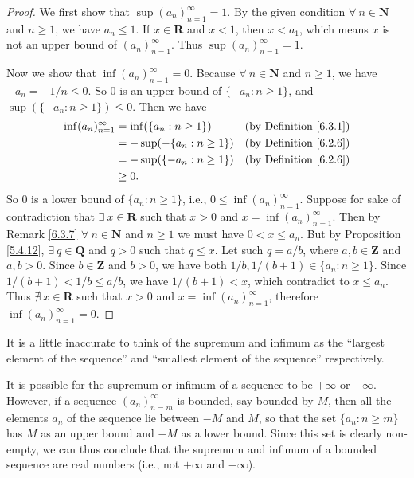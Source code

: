 \begin{proof}
We first show that \(\sup(a_n)_{n = 1}^\infty = 1\).
By the given condition \(\forall\ n \in \mathbf{N}\) and \(n \geq 1\), we have \(a_n \leq 1\).
If \(x \in \mathbf{R}\) and \(x < 1\), then \(x < a_1\), which means \(x\) is not an upper bound of \((a_n)_{n = 1}^\infty\).
Thus \(\sup(a_n)_{n = 1}^\infty = 1\).

Now we show that \(\inf(a_n)_{n = 1}^\infty = 0\).
Because \(\forall\ n \in \mathbf{N}\) and \(n \geq 1\), we have \(-a_n = -1 / n \leq 0\).
So \(0\) is an upper bound of \(\{-a_n : n \geq 1\}\), and \(\sup(\{-a_n : n \geq 1\}) \leq 0\).
Then we have
\begin{align*}
\inf(a_n)_{n = 1}^\infty &= \inf(\{a_n : n \geq 1\}) & \text{(by Definition \ref{6.3.1})} \\
&= -\sup(-\{a_n : n \geq 1\}) & \text{(by Definition \ref{6.2.6})} \\
&= -\sup(\{-a_n : n \geq 1\}) & \text{(by Definition \ref{6.2.6})} \\
&\geq 0.
\end{align*}
So \(0\) is a lower bound of \(\{a_n : n \geq 1\}\), i.e., \(0 \leq \inf(a_n)_{n = 1}^\infty\).
Suppose for sake of contradiction that \(\exists\ x \in \mathbf{R}\) such that \(x > 0\) and \(x = \inf(a_n)_{n = 1}^\infty\).
Then by Remark \ref{6.3.7} \(\forall\ n \in \mathbf{N}\) and \(n \geq 1\) we must have \(0 < x \leq a_n\).
But by Proposition \ref{5.4.12}, \(\exists\ q \in \mathbf{Q}\) and \(q > 0\) such that \(q \leq x\).
Let such \(q = a / b\), where \(a, b \in \mathbf{Z}\) and \(a, b > 0\).
Since \(b \in \mathbf{Z}\) and \(b > 0\), we have both \(1 / b, 1 / (b + 1) \in \{a_n : n \geq 1\}\).
Since \(1 / (b + 1) < 1 / b \leq a / b\), we have \(1 / (b + 1) < x\), which contradict to \(x \leq a_n\).
Thus \(\nexists\ x \in \mathbf{R}\) such that \(x > 0\) and \(x = \inf(a_n)_{n = 1}^\infty\), therefore \(\inf(a_n)_{n = 1}^\infty = 0\).
\end{proof}

\begin{note}
It is a little inaccurate to think of the supremum and infimum as the ``largest element of the sequence'' and ``smallest element of the sequence'' respectively.
\end{note}

\begin{note}
It is possible for the supremum or infimum of a sequence to be \(+\infty\) or \(-\infty\).
However, if a sequence \((a_n)_{n = m}^\infty\) is bounded, say bounded by \(M\), then all the elements \(a_n\) of the sequence lie between \(-M\) and \(M\), so that the set \(\{a_n : n \geq m\}\) has \(M\) as an upper bound and \(-M\) as a lower bound.
Since this set is clearly non-empty, we can thus conclude that the supremum and infimum of a bounded sequence are real numbers (i.e., not \(+\infty\) and \(-\infty\)).
\end{note}

